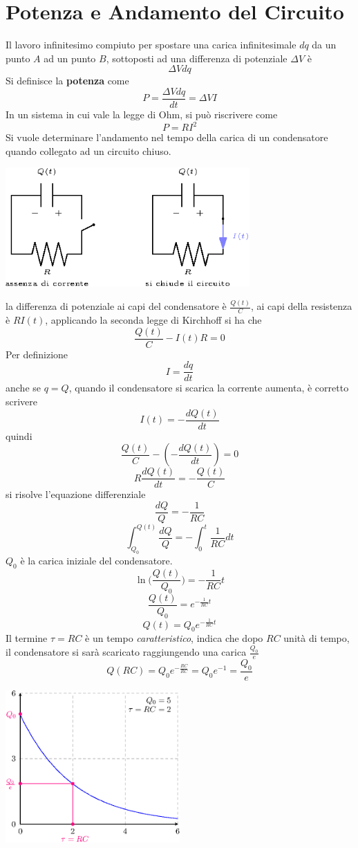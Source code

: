 \documentclass[10pt, letterpaper]{report}
\begin{document}
\section{Potenza e Andamento del Circuito}
Il lavoro infinitesimo compiuto per spostare una carica infinitesimale $dq$ da un punto $A$ ad un punto $B$, sottoposti ad una differenza di potenziale $\Delta V$ è 
$$ \Delta Vdq$$
Si definisce la \textbf{potenza} come 
$$ P=\frac{\Delta Vdq}{dt}=\Delta V I$$
In un sistema in cui vale la legge di Ohm, si può riscrivere come 
$$ P=RI^2$$
Si vuole determinare l'andamento nel tempo della carica di un condensatore quando collegato ad un circuito chiuso.\begin{center}
    \includegraphics[width=0.7\textwidth]{images/caricaCondensatoreTempo.eps}
\end{center}
la differenza di potenziale ai capi del  condensatore è $\frac{Q(t)}{C}$, ai capi della resistenza è $RI(t)$, applicando la seconda legge di Kirchhoff si ha che 
$$ \frac{Q(t)}{C}-I(t)R=0$$
Per definizione $$ I=\frac{dq}{dt}$$
anche se $q=Q$, quando il condensatore si scarica la corrente aumenta, è corretto scrivere 
$$ I(t)=-\frac{dQ(t)}{dt}$$
quindi 
$$ \frac{Q(t)}{C}-(-\frac{dQ(t)}{dt})=0$$
$$ R\frac{dQ(t)}{dt}=-\frac{Q(t)}{C}$$
si risolve l'equazione differenziale 
$$ \frac{dQ}{Q}=-\frac{1}{RC}$$
$$ \int_{Q_0}^{Q(t)}\frac{dQ}{Q}=-\int_0^t\frac{1}{RC}dt$$
$Q_0$ è la carica iniziale del condensatore.
$$ \ln\Big(\frac{Q(t)}{Q_0}\Big)=-\frac{1}{RC}t$$
$$ \frac{Q(t)}{Q_0}=e^{-\frac{1}{RC}t}$$
$$ Q(t)=Q_0e^{-\frac{1}{RC}t}$$
Il termine $\tau=RC$ è un tempo \textit{caratteristico}, indica che dopo $RC$ unità di tempo, il condensatore si sarà scaricato raggiungendo una carica $\frac{Q_0}{e}$
$$ Q(RC)=Q_0e^{-\frac{RC}{RC}}=Q_0e^{-1}=\frac{Q_0}{e}$$
\begin{center}
    \includegraphics[width=0.5\textwidth]{images/tempoCaratteristico.eps}
\end{center}
\end{document}
